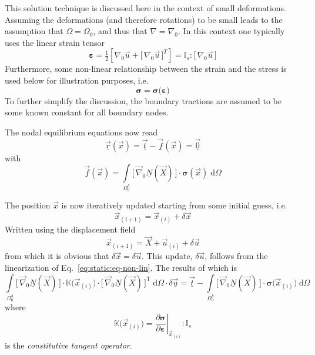 \documentclass[times,namecite]{goose-article}
\begin{document}
This solution technique is discussed here in the context of small deformations. Assuming the deformations (and therefore rotations) to be small leads to the assumption that $\Omega = \Omega_0$, and thus that $\nabla = \nabla_0$. In this context one typically uses the linear strain tensor
\begin{equation}
  \bm{\varepsilon}
  =
  \tfrac{1}{2} \left[ \nabla_0 \vec{u} + \big[\, \nabla_0 \vec{u} \,\big]^T \right]
  =
  \mathbb{I}_s : \big[\, \nabla_0 \vec{u} \,\big]
\end{equation}
Furthermore, some non-linear relationship between the strain and the stress is used below for illustration purposes, i.e.\
\begin{equation}
  \bm{\sigma} = \bm{\sigma} \big( \bm{\varepsilon} \big)
\end{equation}
To further simplify the discussion, the boundary tractions are assumed to be some known constant for all boundary nodes.

The nodal equilibrium equations now read
\begin{equation}
\label{eq:static:eq-non-lin}
  \underline{\vec{r}}(\vec{x})
  =
  \underline{\vec{t}}
  -
  \underline{\vec{f}}(\vec{x})
  =
  \underline{\vec{0}}
\end{equation}
with
\begin{equation}
  \underline{\vec{f}}(\vec{x})
  =
  \int\limits_{\Omega^h_0}
    \big[\, \vec{\nabla}_0 \underline{N}(\vec{X}) \,\big]
    \cdot
    \bm{\sigma}(\vec{x}) \;
  \mathrm{d}\Omega
\end{equation}

The position $\vec{x}$ is now iteratively updated starting from some initial guess, i.e.
\begin{equation}
  \vec{x}_{(i+1)} = \vec{x}_{(i)} + \delta \vec{x}
\end{equation}
Written using the displacement field
\begin{equation}
  \vec{x}_{(i+1)} = \vec{X} + \vec{u}_{(i)} + \delta \vec{u}
\end{equation}
from which it is obvious that $\delta \vec{x} = \delta \vec{u}$. This update, $\delta \vec{u}$, follows from the linearization of Eq.~\eqref{eq:static:eq-non-lin}. The results of which is
\begin{equation}
  \int\limits_{\Omega^h_0}
    \big[\, \vec{\nabla}_0 \underline{N}(\vec{X}) \,\big]
    \cdot
    \mathbb{K}\big(\vec{x}_{(i)}\big)
    \cdot
    \big[\, \vec{\nabla}_0 \underline{N}(\vec{X}) \,\big]^\mathsf{T} \;
  \mathrm{d}\Omega
  \cdot \delta \underline{\vec{u}}
  =
  \underline{\vec{t}}
  -
  \int\limits_{\Omega^h_0}
    \big[\, \vec{\nabla}_0 \underline{N}(\vec{X}) \,\big]
    \cdot
    \bm{\sigma}\big(\vec{x}_{(i)}\big) \;
  \mathrm{d}\Omega
\end{equation}
where
\begin{equation}
  \mathbb{K}\big(\vec{x}_{(i)}\big)
  =
  \left. \frac{\partial \bm{\sigma}}{\partial \bm{\varepsilon}} \right|_{\vec{x}_{(i)}}
  :
  \mathbb{I}_s
\end{equation}
is the \emph{constitutive tangent operator}.
\end{document}
